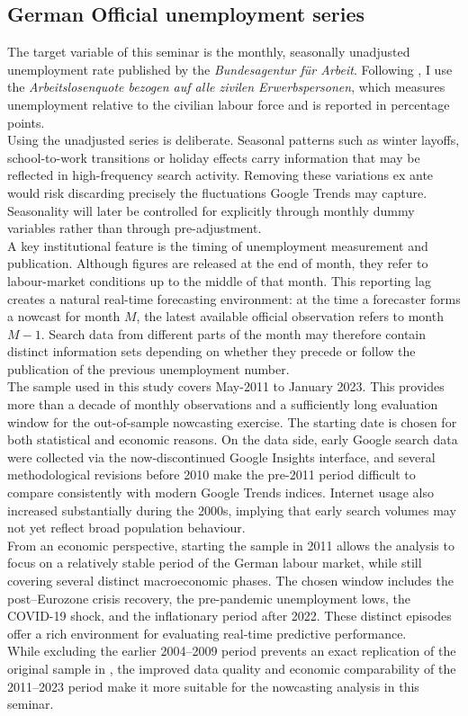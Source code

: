 \documentclass[12pt,a4paper]{article}
\begin{document}
\subsection{German Official unemployment series}
The target variable of this seminar is the monthly, seasonally unadjusted unemployment rate published by the \textit{Bundesagentur für Arbeit}. Following \citet{Askitas}, I use the \textit{Arbeitslosenquote bezogen auf alle zivilen Erwerbspersonen}, which measures unemployment relative to the civilian labour force and is reported in percentage points.\\
Using the unadjusted series is deliberate. Seasonal patterns such as winter layoffs, school-to-work transitions or holiday effects carry information that may be reflected in high-frequency search activity. Removing these variations ex ante would risk discarding precisely the fluctuations Google Trends may capture. Seasonality will later be controlled for explicitly through monthly dummy variables rather than through pre-adjustment.\\
A key institutional feature is the timing of unemployment measurement and publication. Although figures are released at the end of month, they refer to labour-market conditions up to the middle of that month. This reporting lag creates a natural real-time forecasting environment: at the time a forecaster forms a nowcast for month $M$, the latest available official observation refers to month $M-1$. 
Search data from different parts of the month may therefore contain distinct information sets depending on whether they precede or follow the publication of the previous unemployment number.\\
The sample used in this study covers May-2011 to January 2023. This provides more than a decade of monthly observations and a sufficiently long evaluation window for the out-of-sample nowcasting exercise. The starting date is chosen for both statistical and economic reasons. On the data side, early Google search data were collected via the now-discontinued Google Insights interface, and several methodological revisions before 2010 make the pre-2011 period difficult to compare consistently with modern Google Trends indices. Internet usage also increased substantially during the 2000s, implying that early search volumes may not yet reflect broad population behaviour.\\
From an economic perspective, starting the sample in 2011 allows the analysis to focus on a relatively stable period of the German labour market, while still covering several distinct macroeconomic phases. The chosen window includes the post–Eurozone crisis recovery, the pre-pandemic unemployment lows, the COVID-19 shock, and the inflationary period after 2022. These distinct episodes offer a rich environment for evaluating real-time predictive performance.
\\
While excluding the earlier 2004–2009 period prevents an exact replication of the original sample in \citet{Askitas}, the improved data quality and economic comparability of the 2011–2023 period make it more suitable for the nowcasting analysis in this seminar.
\end{document}
